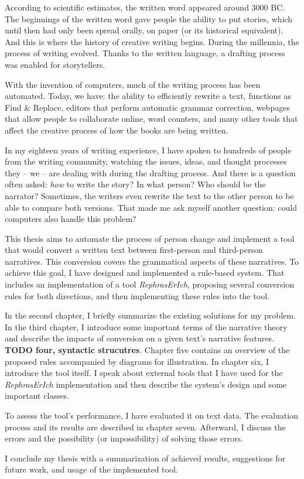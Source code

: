 According to scientific estimates, the written word appeared around 3000 BC. The beginnings of the written word gave people the ability to put stories, which until then had only been spread orally, on paper (or its historical equivalent). And this is where the history of creative writing begins. During the millennia, the process of writing evolved. Thanks to the written language, a drafting process was enabled for storytellers.

With the invention of computers, much of the writing process has been automated. Today, we have: the ability to efficiently rewrite a text, functions as Find \& Replace, editors that perform automatic grammar correction, webpages that allow people to collaborate online, word counters, and many other tools that affect the creative process of how the books are being written.

In my eighteen years of writing experience, I have spoken to hundreds of people from the writing community, watching the issues, ideas, and thought processes they -- we -- are dealing with during the drafting process. And there is a question often asked: \emph{how} to write the story? In what person? Who should be the narrator? Sometimes, the writers even rewrite the text to the other person to be able to compare both versions. That made me ask myself another question: could computers also handle this problem?

This thesis aims to automate the process of person change and implement a tool that would convert a written text between first-person and third-person narratives. This conversion covers the grammatical aspects of these narratives. To achieve this goal, I have designed and implemented a rule-based system. That includes an implementation of a tool \emph{RephrasErIch}, proposing several conversion rules for both directions, and then implementing these rules into the tool.

In the second chapter, I briefly summarize the existing solutions for my problem. In the third chapter, I introduce some important terms of the narrative theory and describe the impacts of conversion on a given text's narrative features. \textbf{TODO four, syntactic strucutres}. Chapter five contains an overview of the proposed rules accompanied by diagrams for illustration. In chapter six, I introduce the tool itself. I speak about external tools that I have used for the \emph{RephrasErIch} implementation and then describe the system's design and some important classes.

To assess the tool's performance, I have evaluated it on text data. The evaluation process and its results are described in chapter seven. Afterward, I discuss the errors and the possibility (or impossibility) of solving those errors.

I conclude my thesis with a summarization of achieved results, suggestions for future work, and usage of the implemented tool.

